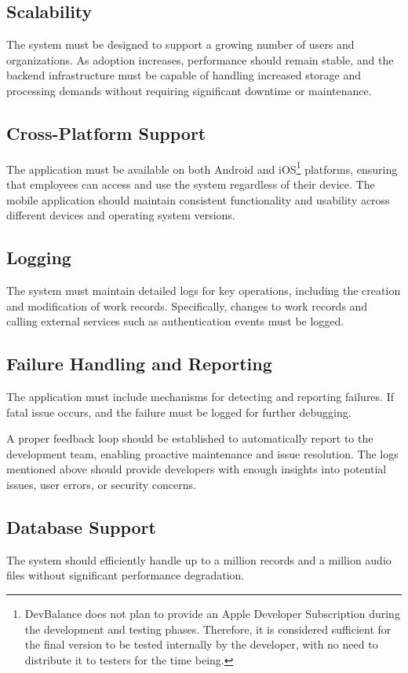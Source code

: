 \documentclass[
  digital,     %
  oneside,     %
  nosansbold,  %
  nocolorbold, %
  lof,         %
  lot,         %
]{fithesis4}
\begin{document}
\subsection{Scalability}  
The system must be designed to support a growing number of users and organizations. As adoption increases, performance should remain stable, and the backend infrastructure must be capable of handling increased storage and processing demands without requiring significant downtime or maintenance.

\subsection{Cross-Platform Support}  
The application must be available on both Android and iOS\footnote{DevBalance does not plan to provide an Apple Developer Subscription during the development and testing phases. Therefore, it is considered sufficient for the final version to be tested internally by the developer, with no need to distribute it to testers for the time being.} platforms, ensuring that employees can access and use the system regardless of their device. The mobile application should maintain consistent functionality and usability across different devices and operating system versions.

\subsection{Logging}  
The system must maintain detailed logs for key operations, including the creation and modification of work records. Specifically, changes to work records and calling external services such as authentication events must be logged.

\subsection{Failure Handling and Reporting}  
The application must include mechanisms for detecting and reporting failures. If fatal issue occurs, and the failure must be logged for further debugging.  

A proper feedback loop should be established to automatically report to the development team, enabling proactive maintenance and issue resolution. The logs mentioned above should provide developers with enough insights into potential issues, user errors, or security concerns.

\subsection{Database Support}  
The system should efficiently handle up to a million records and a million audio files without significant performance degradation.  
\end{document}
